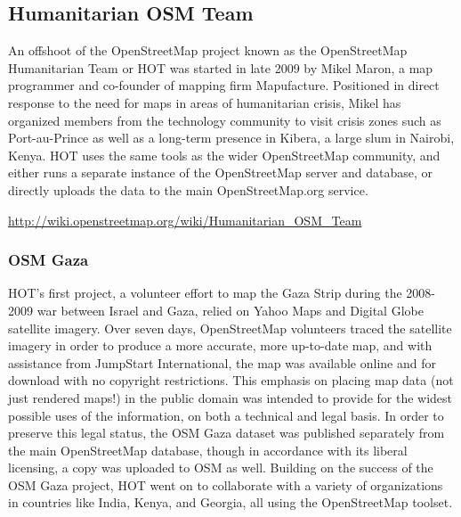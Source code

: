 \documentclass[11pt]{report}
\begin{document}
\subsection{Humanitarian OSM Team}
 
An offshoot of the OpenStreetMap project known as the OpenStreetMap Humanitarian Team or HOT was started in late 2009 by Mikel Maron, a map programmer and co-founder of mapping firm Mapufacture. Positioned in direct response to the need for maps in areas of humanitarian crisis, Mikel has organized members from the technology community to visit crisis zones such as Port-au-Prince as well as a long-term presence in Kibera, a large slum in Nairobi, Kenya. HOT uses the same tools as the wider OpenStreetMap community, and either runs a separate instance of the OpenStreetMap server and database, or directly uploads the data to the main OpenStreetMap.org service. 

\url{http://wiki.openstreetmap.org/wiki/Humanitarian_OSM_Team}

\subsubsection{OSM Gaza}

HOT's first project, a volunteer effort to map the Gaza Strip during the 2008-2009 war between Israel and Gaza, relied on Yahoo Maps and Digital Globe satellite imagery. Over seven days, OpenStreetMap volunteers traced the satellite imagery in order to produce a more accurate, more up-to-date map, and with assistance from JumpStart International, the map was available online and for download with no copyright restrictions.\cite{chilton-crowdsourcing} This emphasis on placing map data (not just rendered maps!) in the public domain was intended to provide for the widest possible uses of the information, on both a technical and legal basis. In order to preserve this legal status, the OSM Gaza dataset was published separately from the main OpenStreetMap database, though in accordance with its liberal licensing, a copy was uploaded to OSM as well. Building on the success of the OSM Gaza project, HOT went on to collaborate with a variety of organizations in countries like India, Kenya, and Georgia, all using the OpenStreetMap toolset. 
\end{document}
